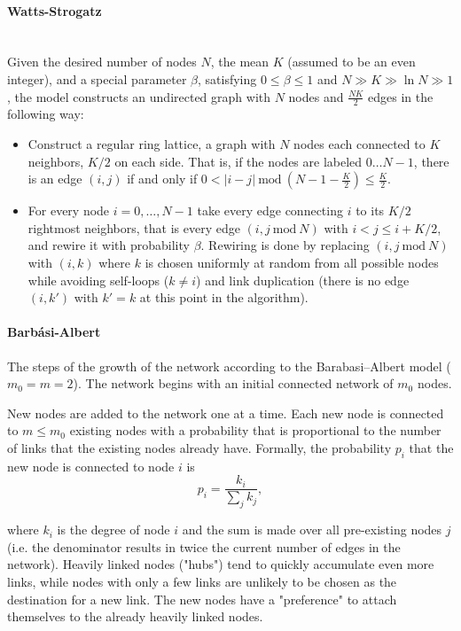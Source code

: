 \documentclass[11pt, a4paper]{article}
\begin{document}
\paragraph{Watts-Strogatz}\\
Given the desired number of nodes $N$, the mean $K$ (assumed to be an even integer), and a special parameter $\beta$, satisfying $0 \leq \beta \leq 1$ and $N\gg K \gg \ln N \gg 1$, the model constructs an undirected graph with $N$ nodes and $\frac{NK}{2}$ edges in the following way:
\begin{itemize}
    \item Construct a regular ring lattice, a graph with $N$ nodes each connected to $K$ neighbors, $K/2$ on each side. That is, if the nodes are labeled  $0 \ldots {N-1}$, there is an edge $(i, j)$ if and only if $0 < |i - j|\ \mathrm{mod}\ \left( N-1-\frac K 2 \right) \leq \frac K 2.$
    \item For every node $i=0,\dots, {N-1}$ take every edge connecting $i$ to its $K/2$ rightmost neighbors, that is every edge $(i, j\ \mathrm{mod}\ N)$ with $i < j \leq i + K/2$, and rewire it with probability $\beta$. Rewiring is done by replacing $(i, j\ \mathrm{mod}\ N)$ with $(i, k)$ where $k$ is chosen uniformly at random from all possible nodes while avoiding self-loops ($k \ne i$) and link duplication (there is no edge $(i, {k'})$ with $k' = k$ at this point in the algorithm).
\end{itemize}

\paragraph{Barb\'{a}si-Albert}
The steps of the growth of the network according to the Barabasi–Albert model  ($m_0=m=2$).
The network begins with an initial connected network of $m_0$ nodes.

New nodes are added to the network one at a time. Each new node is connected to $m \le m_0$ existing nodes with a probability that is proportional to the number of links that the existing nodes already have. Formally, the probability $p_i$ that the new node is connected to node $i$ is 
$$p_i = \frac{k_i}{\sum_j k_j},$$

where $k_i$ is the degree of node $i$ and the sum is made over all pre-existing nodes $j$ (i.e. the denominator results in twice the current number of edges in the network). Heavily linked nodes ("hubs") tend to quickly accumulate even more links, while nodes with only a few links are unlikely to be chosen as the destination for a new link. The new nodes have a "preference" to attach themselves to the already heavily linked nodes.
\\
\end{document}
